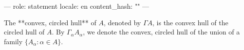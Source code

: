 ---
role: statement
locale: en
content_hash: ""
---

The **convex, circled hull** of $A$, denoted by $\Gamma A$, is the convex hull of the circled hull of $A$. By $\Gamma_\alpha A_\alpha$, we denote the convex, circled hull of the union of a family $\{A_\alpha : \alpha \in A\}$.
